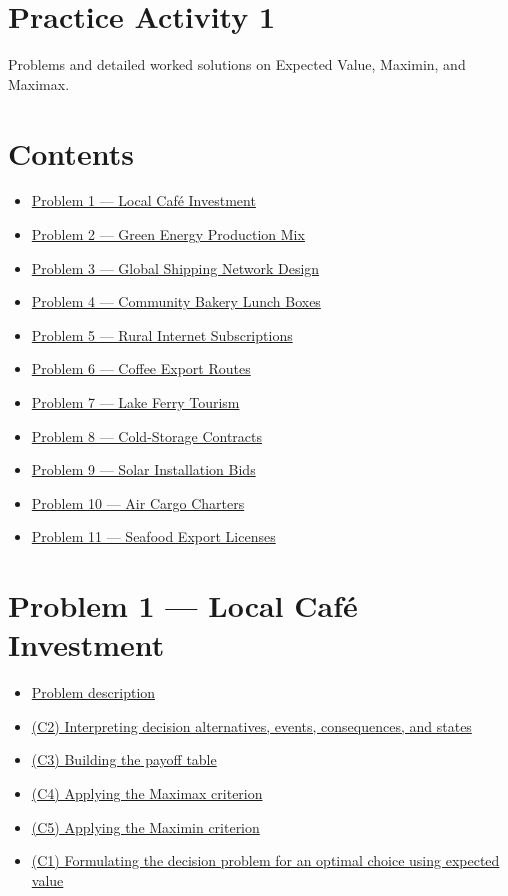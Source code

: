 \documentclass[11pt]{article}
\begin{document}
	
	\section*{Practice Activity 1}
	
	Problems and detailed worked solutions on Expected Value, Maximin, and Maximax.
	
	\section*{Contents}
	
	\hypertarget{table-of-contents}{}
	
	\begin{itemize}
		\item \hyperlink{problem1}{Problem 1 — Local Café Investment}
		\item \hyperlink{problem2}{Problem 2 — Green Energy Production Mix}
		\item \hyperlink{problem3}{Problem 3 — Global Shipping Network Design}
		\item \hyperlink{problem4}{Problem 4 — Community Bakery Lunch Boxes}
		\item \hyperlink{problem5}{Problem 5 — Rural Internet Subscriptions}
		\item \hyperlink{problem6}{Problem 6 — Coffee Export Routes}
		\item \hyperlink{problem7}{Problem 7 — Lake Ferry Tourism}
		\item \hyperlink{problem8}{Problem 8 — Cold-Storage Contracts}
		\item \hyperlink{problem9}{Problem 9 — Solar Installation Bids}
		\item \hyperlink{problem10}{Problem 10 — Air Cargo Charters}
		\item \hyperlink{problem11}{Problem 11 — Seafood Export Licenses}
	\end{itemize}
	
	
	\section*{Problem 1 — Local Café Investment}
	
	\hypertarget{problem1}{}
	
	\hypertarget{problem1-criteria}{}
	
	
	\begin{itemize}
		\item \hyperlink{problem1-problem}{Problem description}
		\item \hyperlink{problem1-c2}{(C2) Interpreting decision alternatives, events, consequences, and states}
		\item \hyperlink{problem1-c3}{(C3) Building the payoff table}
		\item \hyperlink{problem1-c4}{(C4) Applying the Maximax criterion}
		\item \hyperlink{problem1-c5}{(C5) Applying the Maximin criterion}
		\item \hyperlink{problem1-c1}{(C1) Formulating the decision problem for an optimal choice using expected value}
	\end{itemize}
	
\end{document}
